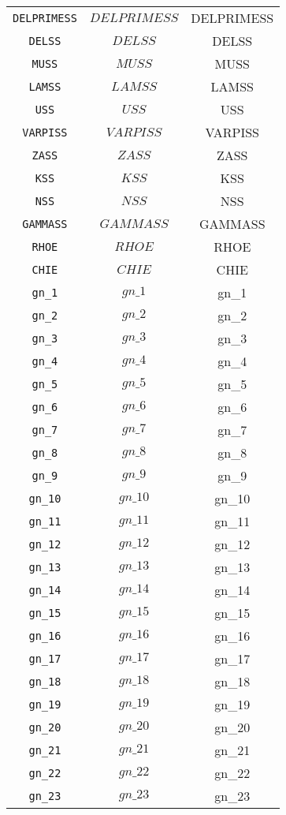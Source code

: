\begin{center}
\begin{longtable}{ccc}
\texttt{DELPRIMESS} & $DELPRIMESS$ & DELPRIMESS\\
\texttt{DELSS} & $DELSS$ & DELSS\\
\texttt{MUSS} & $MUSS$ & MUSS\\
\texttt{LAMSS} & $LAMSS$ & LAMSS\\
\texttt{USS} & $USS$ & USS\\
\texttt{VARPISS} & $VARPISS$ & VARPISS\\
\texttt{ZASS} & $ZASS$ & ZASS\\
\texttt{KSS} & $KSS$ & KSS\\
\texttt{NSS} & $NSS$ & NSS\\
\texttt{GAMMASS} & $GAMMASS$ & GAMMASS\\
\texttt{RHOE} & $RHOE$ & RHOE\\
\texttt{CHIE} & $CHIE$ & CHIE\\
\texttt{gn\_1} & $gn\_1$ & gn\_1\\
\texttt{gn\_2} & $gn\_2$ & gn\_2\\
\texttt{gn\_3} & $gn\_3$ & gn\_3\\
\texttt{gn\_4} & $gn\_4$ & gn\_4\\
\texttt{gn\_5} & $gn\_5$ & gn\_5\\
\texttt{gn\_6} & $gn\_6$ & gn\_6\\
\texttt{gn\_7} & $gn\_7$ & gn\_7\\
\texttt{gn\_8} & $gn\_8$ & gn\_8\\
\texttt{gn\_9} & $gn\_9$ & gn\_9\\
\texttt{gn\_10} & $gn\_10$ & gn\_10\\
\texttt{gn\_11} & $gn\_11$ & gn\_11\\
\texttt{gn\_12} & $gn\_12$ & gn\_12\\
\texttt{gn\_13} & $gn\_13$ & gn\_13\\
\texttt{gn\_14} & $gn\_14$ & gn\_14\\
\texttt{gn\_15} & $gn\_15$ & gn\_15\\
\texttt{gn\_16} & $gn\_16$ & gn\_16\\
\texttt{gn\_17} & $gn\_17$ & gn\_17\\
\texttt{gn\_18} & $gn\_18$ & gn\_18\\
\texttt{gn\_19} & $gn\_19$ & gn\_19\\
\texttt{gn\_20} & $gn\_20$ & gn\_20\\
\texttt{gn\_21} & $gn\_21$ & gn\_21\\
\texttt{gn\_22} & $gn\_22$ & gn\_22\\
\texttt{gn\_23} & $gn\_23$ & gn\_23\\

\end{longtable}
\end{center}
